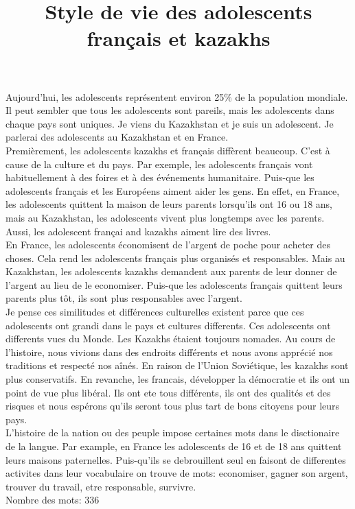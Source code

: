 \documentclass[a4paper, 12pt]{article}
\title{Style de vie des adolescents français et kazakhs}
\author{}
\date{}
\begin{document}
\maketitle
{}

Aujourd'hui, les adolescents représentent environ 25\% \cite{teenagers} de la population mondiale. Il peut sembler que tous les adolescents sont pareils, mais les adolescents dans chaque pays sont uniques. Je viens du Kazakhstan et je suis un adolescent. Je parlerai des adolescents au Kazakhstan et en France. \\

Premièrement, les adolescents kazakhs et français diffèrent beaucoup. C'est à cause de la culture et du pays. Par exemple, les adolescents français vont habituellement à des foires et à des événements humanitaire. Puis-que les adolescents français et les Européens aiment aider les gens. En effet, en France, les adolescents quittent la maison de leurs parents lorsqu'ils ont 16 ou 18 ans, mais au Kazakhstan, les adolescents vivent plus longtemps avec les parents. Aussi, les adolescent françai and kazakhs aiment lire des livres. \cite{hobbies} \\

En France, les adolescents économisent de l'argent de poche pour acheter des choses.
Cela rend les adolescents français plus organisés et responsables.
Mais au Kazakhstan, les adolescents kazakhs demandent aux parents de leur donner de l'argent au lieu de le economiser.
Puis-que les adolescents français quittent leurs parents plus tôt, ils sont plus responsables avec l'argent.\\

Je pense ces similitudes et différences culturelles existent parce que ces adolescents ont grandi dans le pays et cultures differents.
Ces adolescents ont differents vues du Monde.
Les Kazakhs étaient toujours nomades.
Au cours de l'histoire, nous vivions dans des endroits différents et nous avons apprécié nos traditions et respecté nos aînés.
En raison de l'Union Soviétique, les kazakhs sont plus conservatifs.
En revanche, les francais, développer la démocratie et ils ont un point de vue plus libéral.
Ils ont ete tous différents, ils ont des qualités et des risques et nous espérons qu’ils seront tous plus tart de bons citoyens pour leurs pays.\\

L'histoire de la nation ou des peuple impose certaines mots dans le disctionaire de la langue.
Par example, en France les adolescents de 16 et de 18 ans quittent leurs maisons paternelles.
Puis-qu'ils se debrouillent seul en faisont de differentes activites dans leur vocabulaire on trouve de mots:
economiser, gagner son argent, trouver du travail, etre responsable, survivre.\\

Nombre des mots: 336



\end{document}
